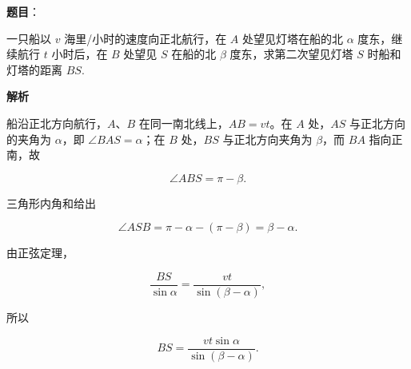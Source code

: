 \begin{answer}

\textbf{题目}：

一只船以 $v$ 海里/小时的速度向正北航行，在 $A$ 处望见灯塔在船的北 $\alpha$ 度东，继续航行 $t$ 小时后，在 $B$ 处望见 $S$ 在船的北 $\beta$ 度东，求第二次望见灯塔 $S$ 时船和灯塔的距离 $BS$.
\nopagebreak[4]
\begin{center}\end{center}
\nopagebreak[4]
\textbf{解析}

船沿正北方向航行，$A$、$B$ 在同一南北线上，$AB=vt$。在 $A$ 处，$AS$ 与正北方向的夹角为 $\alpha$，即 $\angle BAS=\alpha$；在 $B$ 处，$BS$ 与正北方向夹角为 $\beta$，而 $BA$ 指向正南，故

\nopagebreak[4]
\[
\angle ABS=\pi-\beta.
\]

三角形内角和给出

\nopagebreak[4]
\[
\angle ASB=\pi-\alpha-(\pi-\beta)=\beta-\alpha.
\]

由正弦定理，

\nopagebreak[4]
\[
\frac{BS}{\sin\alpha}=\frac{vt}{\sin(\beta-\alpha)},
\]

所以

\nopagebreak[4]
\[
BS=\frac{vt\sin\alpha}{\sin(\beta-\alpha)}.
\]
\nopagebreak[4]
\begin{center}\end{center}
\nopagebreak[4]

\end{answer}
